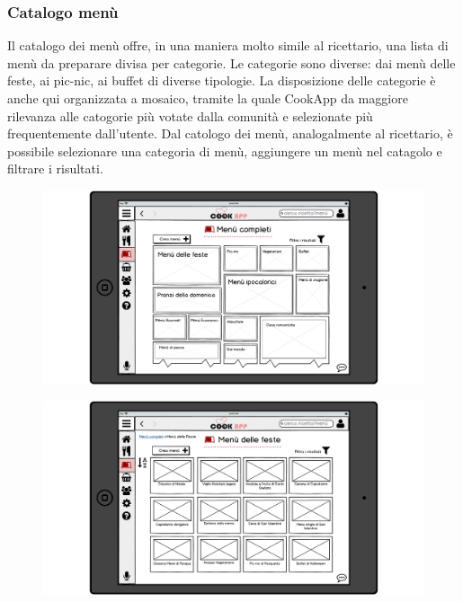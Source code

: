 \subsubsection{Catalogo menù}
Il catalogo dei menù offre, in una maniera molto simile al ricettario,
una lista di menù da preparare divisa per categorie. Le categorie sono
diverse: dai menù delle feste, ai pic-nic, ai buffet di diverse
tipologie. La disposizione delle categorie è anche qui organizzata a
mosaico, tramite la quale CookApp da maggiore rilevanza alle catogorie
più votate dalla comunità e selezionate più frequentemente dall'utente.
Dal catologo dei menù, analogalmente al ricettario, è possibile selezionare una categoria di menù,
aggiungere un menù nel catagolo e filtrare i risultati.

\begin{figure}[H]
	\centering
	\includegraphics[width=0.95\linewidth]{img/mockup/menu.png}
\end{figure}
\begin{figure}[H]
	\centering
	\includegraphics[width=0.95\linewidth]{img/mockup/menu-2.png}
\end{figure}

